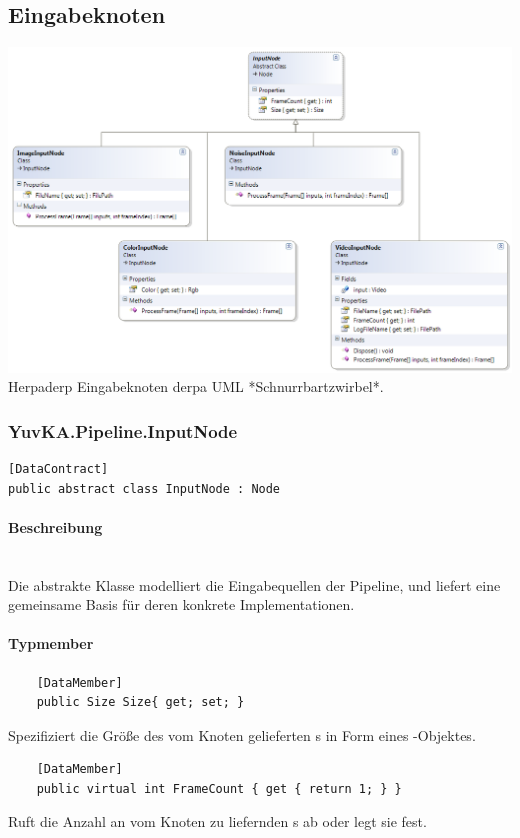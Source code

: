\subsection{Eingabeknoten}

\includegraphics[width=\textwidth]{YuvKA.Pipeline/inputnodes.png}
Herpaderp Eingabeknoten derpa UML *Schnurrbartzwirbel*.

\subsubsection{YuvKA.Pipeline.InputNode}

\begin{verbatim}
[DataContract]
public abstract class InputNode : Node
\end{verbatim}

\paragraph{Beschreibung}~\\
Die abstrakte Klasse  modelliert die Eingabequellen der Pipeline, und liefert eine gemeinsame Basis für deren konkrete Implementationen.

\paragraph{Typmember}
\begin{itemize}

	\begin{verbatim}
	[DataMember]
	public Size Size{ get; set; }
	\end{verbatim}
	Spezifiziert die Größe des vom Knoten gelieferten s in Form eines -Objektes.

	\begin{verbatim}
	[DataMember]
	public virtual int FrameCount { get { return 1; } }
	\end{verbatim}
	Ruft die Anzahl an vom Knoten zu liefernden s ab oder legt sie fest.

\end{itemize}

